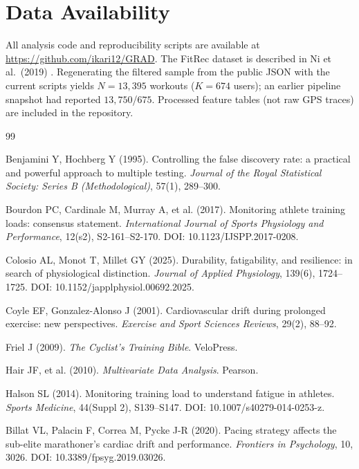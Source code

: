 \documentclass[times, twoside]{zHenriquesLab-StyleBioRxiv}
\begin{document}
\section*{Data Availability}
All analysis code and reproducibility scripts are available at \url{https://github.com/ikari12/GRAD}. The FitRec dataset is described in Ni et al.\ (2019) \cite{ni2019}. Regenerating the filtered sample from the public JSON with the current scripts yields $N = 13{,}395$ workouts ($K = 674$ users); an earlier pipeline snapshot had reported $13{,}750$/$675$. Processed feature tables (not raw GPS traces) are included in the repository.

\begin{thebibliography}{99}

Benjamini Y, Hochberg Y (1995). Controlling the false discovery rate: a practical and powerful approach to multiple testing. \textit{Journal of the Royal Statistical Society: Series B (Methodological)}, 57(1), 289--300.

Bourdon PC, Cardinale M, Murray A, et al. (2017). Monitoring athlete training loads: consensus statement. \textit{International Journal of Sports Physiology and Performance}, 12(s2), S2-161--S2-170. DOI: 10.1123/IJSPP.2017-0208.

Colosio AL, Monot T, Millet GY (2025). Durability, fatigability, and resilience: in search of physiological distinction. \textit{Journal of Applied Physiology}, 139(6), 1724--1725. DOI: 10.1152/japplphysiol.00692.2025.

Coyle EF, Gonzalez-Alonso J (2001). Cardiovascular drift during prolonged exercise: new perspectives. \textit{Exercise and Sport Sciences Reviews}, 29(2), 88--92.

Friel J (2009). \textit{The Cyclist's Training Bible}. VeloPress.

Hair JF, et al. (2010). \textit{Multivariate Data Analysis}. Pearson.

Halson SL (2014). Monitoring training load to understand fatigue in athletes. \textit{Sports Medicine}, 44(Suppl 2), S139--S147. DOI: 10.1007/s40279-014-0253-z.

Billat VL, Palacin F, Correa M, Pycke J-R (2020). Pacing strategy affects the sub-elite marathoner's cardiac drift and performance. \textit{Frontiers in Psychology}, 10, 3026. DOI: 10.3389/fpsyg.2019.03026.


\end{thebibliography}
\end{document}
